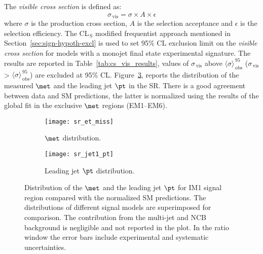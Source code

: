 The \emph{visible cross section} is defined as:
\begin{equation}
  \label{eq:90}
  \sigma_\mathrm{\, vis} = \sigma \times A \times \epsilon
\end{equation}
where $\sigma$ is the production cross section, $A$ is the selection acceptance
and $\epsilon$ is the selection efficiency. The CL$_\mathrm{\, S}$ modified
frequentist approach mentioned in Section~\ref{sec:sign-hypoth-excl} is used to
set 95\% CL exclusion limit on the \emph{visible cross section} for models with
a monojet final state experimental signature. The results are reported in
Table~\ref{tab:cs_vis_results}, values of $\sigma_\mathrm{\, vis}$ above
$\langle \sigma \rangle_\mathrm{\, obs}^{\, 95}$ ($\sigma_\mathrm{\, vis}$ >
$\langle \sigma \rangle_\mathrm{\, obs}^{\, 95}$) are excluded at 95\%
CL. Figure~\ref{fig:sr_plots}, reports the distribution of the measured $\met$
and the leading jet $\pt$ in the SR\@. There is a good agreement between data
and SM predictions, the latter is normalized using the results of the global fit
in the exclusive $\met$ regions (EM1--EM6).

\begin{figure}[!th]
  \centering
  \begin{subfigure}[t]{.48\linewidth}
    \texttt{[image: sr\_et\_miss]}
    \caption{$\met$ distribution.}
    \label{fig:sr_et_miss}
  \end{subfigure}
  \begin{subfigure}[t]{.48\linewidth}
    \texttt{[image: sr\_jet1\_pt]}
    \caption{Leading jet $\pt$ distribution.}
    \label{fig:sr_jet1_pt}
  \end{subfigure}
  \caption{Distribution of the $\met$ and the leading jet $\pt$ for IM1 signal
    region compared with the normalized SM predictions. The distributions of
    different signal models are superimposed for comparison. The contribution
    from the multi-jet and NCB background is negligible and not reported in the
    plot. In the ratio window the error bars include experimental and systematic
    uncertainties.}
  \label{fig:sr_plots}
\end{figure}

